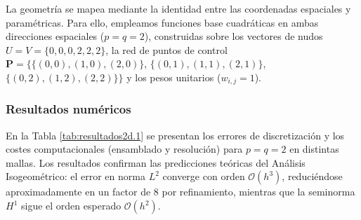 \documentclass[11pt]{book}
\theoremstyle{plain} %
\theoremstyle{definition} %
\theoremstyle{definition} %
\begin{document}
La geometría se mapea mediante la identidad entre las coordenadas espaciales y paramétricas. Para ello, empleamos funciones base cuadráticas en ambas direcciones espaciales ($p = q = 2$), construidas sobre los vectores de nudos $U = V = \{0, 0, 0, 2, 2, 2\}$,
la red de puntos de control $\mathbf{P} = \{ \{(0,0), (1,0), (2,0)\}$, $\{(0,1), (1,1), (2,1)\}$, $\{(0,2), (1,2), (2,2)\} \}$ y los pesos unitarios ($w_{i,j} = 1$).

\vspace{-0.3cm}

\subsubsection{Resultados numéricos}
    En la Tabla \ref{tab:resultados2d.1} se presentan los errores de discretización y los costes computacionales (ensamblado y resolución) para $p=q=2$ en distintas mallas. Los resultados confirman las predicciones teóricas del Análisis Isogeométrico: el error en norma $L^2$ converge con orden $\mathcal{O}(h^3)$, reduciéndose aproximadamente en un factor de $8$ por refinamiento, mientras que la seminorma $H^1$ sigue el orden esperado $\mathcal{O}(h^2)$.
\end{document}
